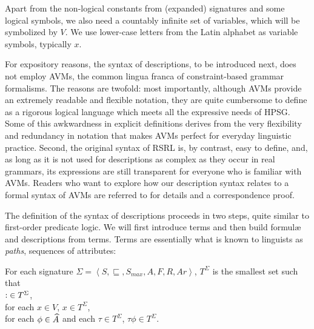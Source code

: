 \documentclass[output=paper
 	        ,biblatex
                ,babelshorthands
                ,newtxmath
                ,draftmode
                ,colorlinks, citecolor=brown
]{langscibook}
\begin{document}
{\begin{exe}
  \ex
\end{exe}

Apart from the non-logical constants from (expanded) signatures and
some logical symbols, we also need a countably infinite set of
variables, which will be symbolized by $V$. We use lower-case letters
from the Latin alphabet as variable symbols, typically $x$.


For expository reasons, the syntax of descriptions, to be introduced
next, does not employ AVMs, the common
lingua franca of con\-straint-based grammar formalisms. The reasons are
twofold: most importantly, although AVMs provide an extremely readable
and flexible notation, they are quite cumbersome to define as a
rigorous logical language which meets all the expressive needs of HPSG. Some
of this awkwardness in explicit definitions derives from the very
flexibility and redundancy in notation that makes AVMs perfect for
everyday linguistic practice. Second, the original syntax of RSRL
is, by contrast, easy to define, and, as long as it is not used
for descriptions as complex as they occur in real grammars, its expressions are
still transparent for everyone who is familiar with AVMs. Readers who
want to explore how our description syntax relates to a formal syntax
of AVMs are referred to \cite{Richter2004a-u} for details and a
correspondence proof.

The definition of the syntax of descriptions proceeds in two steps,
quite similar to first-order predicate logic. We will first introduce
terms and then build formulæ and descriptions from terms. Terms are essentially
what is known to linguists as \emph{paths}, sequences of attributes:

\begin{mydef}\label{def-terms}
  For each signature $\Sigma=\left<S,\sqsubseteq,S_{max},A,F,R,Ar\right>$,
  $T^{\Sigma}$ is the smallest set such that\\
  $\operatorname{:}\in T^{\Sigma}$,\\
  for each $x\in V$, $x\in T^{\Sigma}$,\\
  for each $\phi \in \widehat{A}$ and each $\tau\in T^{\Sigma}$, $\tau\phi\in T^{\Sigma}$.
\end{mydef}

}
\end{document}
